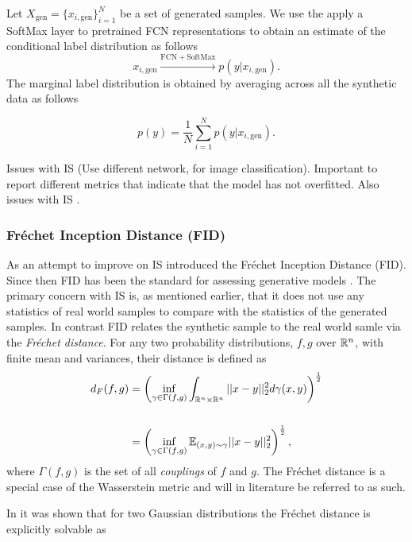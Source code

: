 \documentclass[../../thesis.tex]{subfiles}
\begin{document}
Let $X_{\text{gen}} = \{x_{i,\text{gen}}\}_{i=1}^N$ be a set of generated samples. We use the apply a SoftMax layer to pretrained FCN representations to obtain an estimate of the conditional label distribution as follows
\[
    x_{i,\text{gen}} \xrightarrow{\mathrm{FCN} + \mathrm{SoftMax}} p(y |x_{i,\text{gen}}).
\]
The marginal label distribution is obtained by averaging across all the synthetic data as follows

\[
    p(y) = \frac{1}{N} \sum_{i=1}^N p(y |x_{i,\text{gen}}).
\]

Issues with IS \cite{barratt2018note} (Use different network, for image classification).  Important to report different metrics that indicate that the model has not overfitted. 
Also issues with IS \cite{borji2021pros}.\newline

\subsubsection{Fréchet Inception Distance (FID)}
As an attempt to improve on IS \cite{heusel2018gans} introduced the Fréchet Inception Distance (FID). Since then FID has been the standard for assessing generative models \cite{borji2021pros}.\newline
The primary concern with IS is, as mentioned earlier, that it does not use any statistics of real world samples to compare with the statistics of the generated samples. In contrast FID relates the synthetic sample to the real world samle via the \textit{Fréchet distance}. For any two probability distributions, $f,g$ over $\mathbb{R}^n$, with finite mean and variances, their  distance is defined as 
\begin{equation}
    \begin{aligned}
        d_F(f,g) &= \left(\inf_{\gamma \in \Gamma(f,g)} \int_{\mathbb{R}^n\times\mathbb{R}^n}||x-y||_2^2d\gamma(x,y) \right)^{\frac{1}{2}}\\\\
            &= \left(\inf_{\gamma \in \Gamma(f,g)} \mathbb{E}_{(x,y)\sim \gamma} ||x-y||_2^2\right)^{\frac{1}{2}},
    \end{aligned}
\end{equation}
where $\Gamma(f,g)$ is the set of all \textit{couplings} of $f$ and $g$. The Fréchet distance is a special case of the Wasserstein metric and will in literature be referred to as such.\newline 

In \cite{DOWSON1982450} it was shown that for two Gaussian distributions the Fréchet distance is explicitly solvable as
\end{document}
